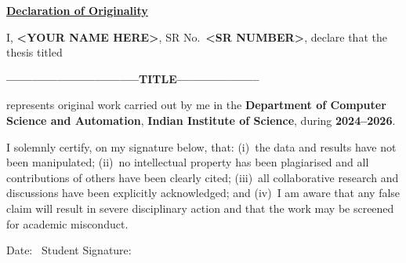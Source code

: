 %
%     

\newpage
{}
{}
\thispagestyle{plain}

{\centering
  \large\underline{\textbf{Declaration of Originality}}\par
}

\vspace{3mm}

\noindent
I, \textbf{<YOUR NAME HERE>}, SR No.\ \textbf{<SR NUMBER>},
declare that the thesis titled

\vspace{1.5mm}
{\centering
  \textbf{--------------------------------TITLE--------------------}\par
}
\vspace{1.5mm}

\noindent
represents original work carried out by me in the \textbf{Department of
Computer Science and Automation}, \textbf{Indian Institute of Science},
during \textbf{2024--2026}.

\vspace{3mm}

\noindent
I solemnly certify, on my signature below, that: (i)~the data and
results have not been manipulated; (ii)~no intellectual property has been
plagiarised and all contributions of others have been clearly cited;
(iii)~all collaborative research and discussions have been explicitly
acknowledged; and (iv)~I am aware that any false claim will result in
severe disciplinary action and that the work may be screened for
academic misconduct.

\vspace{5mm}

\noindent
\footnotesize
Date:~\underline{\hspace{28mm}}
\hfill
Student Signature:~\underline{\hspace{48mm}}
\normalsize

